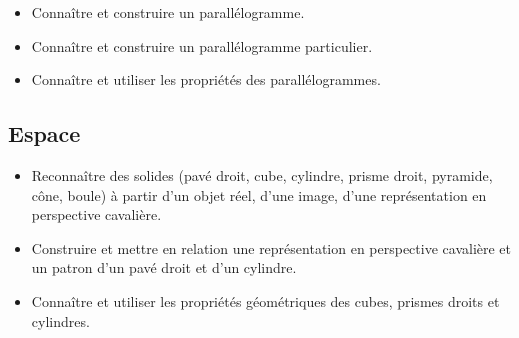 \documentclass[a4paper,12pt,fleqn]{article}	
\begin{document}
\begin{itemize}
	\item {}Connaître et construire un parallélogramme.
	\item {}Connaître et construire un parallélogramme particulier.
	\item {}Connaître et utiliser les propriétés des parallélogrammes.
\end{itemize}

\subsection*{Espace}

\begin{itemize}
	\item {}Reconnaître des solides (pavé droit, cube, cylindre, prisme droit, pyramide, cône, boule) à partir d’un objet réel, d’une image, d’une représentation en perspective cavalière.
	\item {}Construire et mettre en relation une représentation en perspective cavalière et un patron d’un pavé droit et d’un cylindre.
    \item {}Connaître et utiliser les propriétés géométriques des cubes, prismes droits et cylindres.
\end{itemize}
	
\end{document}

